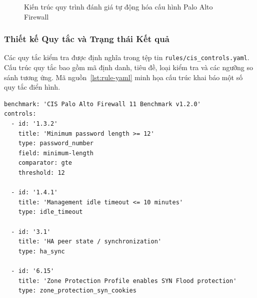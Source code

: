 \documentclass[12pt,a4paper]{article}
\begin{document}
\begin{figure}[H]
\caption{Kiến trúc quy trình đánh giá tự động hóa cấu hình Palo Alto Firewall}
\label{fig:auto-architecture}
\end{figure}

\subsubsection{Thiết kế Quy tắc và Trạng thái Kết quả}
Các quy tắc kiểm tra được định nghĩa trong tệp tin \texttt{rules/cis\_controls.yaml}. Cấu trúc quy tắc bao gồm mã định danh, tiêu đề, loại kiểm tra và các ngưỡng so sánh tương ứng. Mã nguồn~\ref{lst:rule-yaml} minh họa cấu trúc khai báo một số quy tắc điển hình.

\begin{lstlisting}[language={},caption={Cấu trúc khai báo quy tắc CIS trong tệp tin cis\_controls.yaml},label={lst:rule-yaml}]
benchmark: 'CIS Palo Alto Firewall 11 Benchmark v1.2.0'
controls:
  - id: '1.3.2'
    title: 'Minimum password length >= 12'
    type: password_number
    field: minimum-length
    comparator: gte
    threshold: 12

  - id: '1.4.1'
    title: 'Management idle timeout <= 10 minutes'
    type: idle_timeout

  - id: '3.1'
    title: 'HA peer state / synchronization'
    type: ha_sync

  - id: '6.15'
    title: 'Zone Protection Profile enables SYN Flood protection'
    type: zone_protection_syn_cookies
\end{lstlisting}
\end{document}

